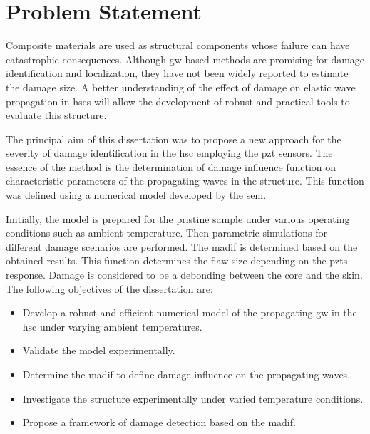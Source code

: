 

\chapter[Problem Statement]{Problem Statement}
\label{ch:problem}



Composite materials are used as structural components whose failure can have catastrophic consequences.
Although \ac{gw} based methods are promising for damage identification and localization, they have not been widely reported to estimate the damage size.
A better understanding of the effect of damage on elastic wave propagation in \acp{hsc} will allow the development of robust and practical tools to evaluate this structure.

The principal aim of this dissertation was to propose a new approach for the severity of damage identification in the \ac{hsc} employing the \ac{pzt} sensors.
The essence of the method is the determination of damage influence function on characteristic parameters of the propagating waves in the structure.
This function was defined using a numerical model developed by the \ac{sem}.

Initially, the model is prepared for the pristine sample under various operating conditions such as ambient temperature.
Then parametric simulations for different damage scenarios are performed.
The \ac{madif} is determined based on the obtained results. 
This function determines the flaw size depending on the \acp{pzt} response.
Damage is considered to be a debonding between the core and the skin. 
The following objectives of the dissertation are:
\begin{itemize}
	\item Develop a robust and efficient numerical model of the propagating \ac{gw} in the \ac{hsc} under varying ambient temperatures.
	\item Validate the model experimentally.
	\item Determine the \ac{madif} to define damage influence on the propagating waves.
	\item Investigate the structure experimentally under varied temperature conditions.
	\item Propose a framework of damage detection based on the \ac{madif}.
\end{itemize}

